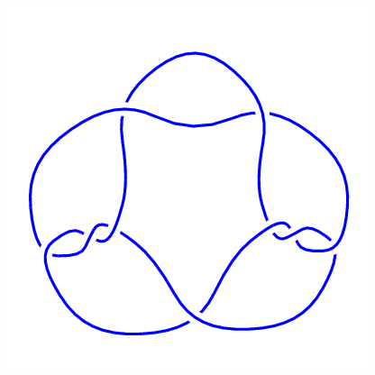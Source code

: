 \begin{figure}[H]
\begin{minipage}[b]{.18\linewidth}
    \end{minipage}
    \begin{minipage}[b]{.18\linewidth}
        \centering
        \includegraphics[width=\linewidth]{../data/9_10.png}
    \end{minipage}
\end{figure}
